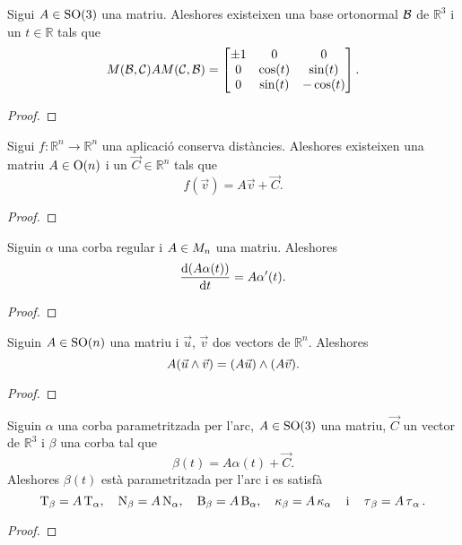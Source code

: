 \documentclass[../Apunts.tex]{subfiles}
\begin{document}
	\begin{proposition}
		Sigui \(A\in\mathrm{SO}(3)\) una matriu. Aleshores existeixen una base ortonormal \(\mathcal{B}\) de \(\mathbb{R}^{3}\) i un \(t\in\mathbb{R}\) tals que
		\[M(\mathcal{B},\mathcal{C})AM(\mathcal{C},\mathcal{B})=\begin{bmatrix}
			\pm1 & 0 & 0 \\
			0 & \cos(t) & \sin(t) \\
			0 & \sin(t) & -\cos(t)
		\end{bmatrix}.\]
		\begin{proof}
		\end{proof}
	\end{proposition}
	\begin{proposition}
		\label{prop:forma matricial de les aplicacions que conserven distàncies}
		Sigui \(f\colon\mathbb{R}^{n}\longrightarrow\mathbb{R}^{n}\) una aplicació conserva distàncies. Aleshores existeixen una matriu \(A\in\mathrm{O}(n)\) i un \(\vec{C}\in\mathbb{R}^{n}\) tals que
		\[f(\vec{v})=A\vec{v}+\vec{C}.\]
		\begin{proof}
		\end{proof}
	\end{proposition}
	\begin{proposition}
		\label{prop:derivada del producte d'una matriu per una corba}
		Siguin \(\alpha\) una corba regular i \(A\in M_{n}\) una matriu. Aleshores
		\[\frac{\mathrm{d}(A\alpha(t))}{\mathrm{d} t}=A\alpha'(t).\]
		\begin{proof}
		\end{proof}
	\end{proposition}
	\begin{proposition}
		\label{prop:les matrius especials ortogonals conserven el producte vectorial}
		Siguin \(A\in\mathrm{SO}(n)\) una matriu i \(\vec{u}\), \(\vec{v}\) dos vectors de \(\mathbb{R}^{n}\). Aleshores
		\[A(\vec{u}\mathbin{\wedge}\vec{v})=(A\vec{u})\mathbin{\wedge}(A\vec{v}).\]
		\begin{proof}
		\end{proof}
	\end{proposition}
	\begin{corollary}
		\label{cor:una corba parametritzada per l'arc i la seva imatge per una aplicació que conserva les distàncies són equivalents}
		Siguin \(\alpha\) una corba parametritzada per l'arc, \(A\in\mathrm{SO}(3)\) una matriu, \(\vec{C}\) un vector de \(\mathbb{R}^{3}\) i \(\beta\) una corba tal que
		\[\beta(t)=A\alpha(t)+\vec{C}.\]
		Aleshores \(\beta(t)\) està parametritzada per l'arc i es satisfà
		\[\operatorname{T}_{\beta}=A\operatorname{T}_{\alpha},\quad\operatorname{N}_{\beta}=A\operatorname{N}_{\alpha},\quad\operatorname{B}_{\beta}=A\operatorname{B}_{\alpha},\quad\operatorname{\kappa}_{\beta}=A\operatorname{\kappa}_{\alpha}\quad\text{i}\quad\operatorname{\tau}_{\beta}=A\operatorname{\tau}_{\alpha}.\]
		\begin{proof}
		\end{proof}
	\end{corollary}
\end{document}
